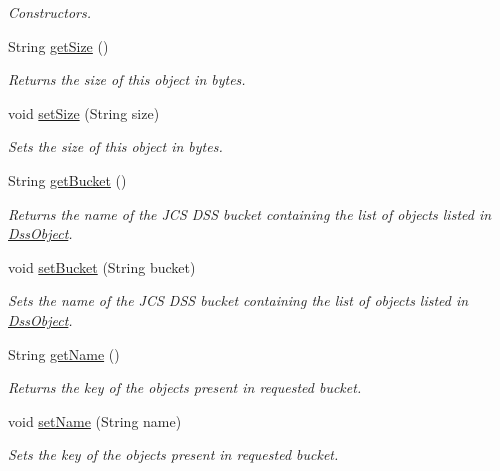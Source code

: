 \begin{DoxyCompactItemize}
\begin{DoxyCompactList}\small\item\em Constructors. \end{DoxyCompactList}\item 
String \hyperlink{classorg_1_1jcs_1_1dss_1_1main_1_1DssObject_a33996ed5e964cd484e8537881760d6a9}{get\+Size} ()
\begin{DoxyCompactList}\small\item\em Returns the size of this object in bytes. \end{DoxyCompactList}\item 
void \hyperlink{classorg_1_1jcs_1_1dss_1_1main_1_1DssObject_af8b6584de03d9b53b790217d0d09e6a9}{set\+Size} (String size)
\begin{DoxyCompactList}\small\item\em Sets the size of this object in bytes. \end{DoxyCompactList}\item 
String \hyperlink{classorg_1_1jcs_1_1dss_1_1main_1_1DssObject_a0c98ef4b11b423d1bdfb8ddedce55a2a}{get\+Bucket} ()
\begin{DoxyCompactList}\small\item\em Returns the name of the J\+CS D\+SS bucket containing the list of objects listed in \hyperlink{classorg_1_1jcs_1_1dss_1_1main_1_1DssObject}{Dss\+Object}. \end{DoxyCompactList}\item 
void \hyperlink{classorg_1_1jcs_1_1dss_1_1main_1_1DssObject_a60df10d8011cf67d4697bd9db0a8d5ef}{set\+Bucket} (String bucket)
\begin{DoxyCompactList}\small\item\em Sets the name of the J\+CS D\+SS bucket containing the list of objects listed in \hyperlink{classorg_1_1jcs_1_1dss_1_1main_1_1DssObject}{Dss\+Object}. \end{DoxyCompactList}\item 
String \hyperlink{classorg_1_1jcs_1_1dss_1_1main_1_1DssObject_ac4ff426d1e85e20212aca1a1af39f82b}{get\+Name} ()
\begin{DoxyCompactList}\small\item\em Returns the key of the objects present in requested bucket. \end{DoxyCompactList}\item 
void \hyperlink{classorg_1_1jcs_1_1dss_1_1main_1_1DssObject_ae484c81f8a7ba64a524fa6c41ffd11ce}{set\+Name} (String name)
\begin{DoxyCompactList}\small\item\em Sets the key of the objects present in requested bucket. \end{DoxyCompactList}\item 

\end{DoxyCompactItemize}
